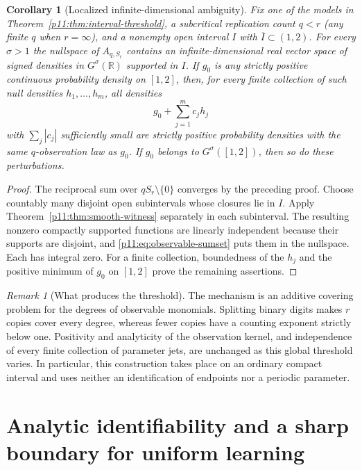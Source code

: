 \documentclass[11pt,letterpaper]{article}
\newtheorem{corollary}[theorem]{Corollary}
\theoremstyle{definition}
\theoremstyle{remark}
\newtheorem{remark}[theorem]{Remark}
\newcommand{\1}{\mathbf 1}
\begin{document}
\begin{corollary}[Localized infinite-dimensional ambiguity]
\label{p11:cor:interval-local-ambiguity}
Fix one of the models in Theorem~\ref{p11:thm:interval-threshold}, a
subcritical replication count $q<r$ (any finite $q$ when $r=\infty$),
and a nonempty open interval $I$ with $\overline I\subset(1,2)$.
For every $\sigma>1$ the nullspace of $A_{q,S_r}$ contains an
infinite-dimensional real vector space of signed densities in
$G^\sigma(\mathbb R)$ supported in $I$.
If $g_0$ is any strictly positive continuous probability density on
$[1,2]$, then, for every finite collection of such null densities
$h_1,\ldots,h_m$, all densities
\[
 g_0+\sum_{j=1}^m c_jh_j
\]
with $\sum_j|c_j|$ sufficiently small are strictly positive probability
densities with the same $q$-observation law as $g_0$.  If $g_0$ belongs
to $G^\sigma([1,2])$, then so do these perturbations.
\end{corollary}
\begin{proof}
The reciprocal sum over $qS_r\setminus\{0\}$ converges by the preceding
proof.  Choose countably many disjoint open subintervals whose closures
lie in $I$.  Apply Theorem~\ref{p11:thm:smooth-witness} separately in each
subinterval.  The resulting nonzero compactly supported functions are
linearly independent because their supports are disjoint, and
\eqref{p11:eq:observable-sumset} puts them in the nullspace.  Each has
integral zero.  For a finite collection, boundedness of the $h_j$ and
the positive minimum of $g_0$ on $[1,2]$ prove the remaining assertions.
\end{proof}

\begin{remark}[What produces the threshold]
The mechanism is an additive covering problem for the degrees of
observable monomials.  Splitting binary digits makes $r$ copies cover
every degree, whereas fewer copies have a counting exponent strictly
below one.  Positivity and analyticity of the observation kernel,
and independence of every finite collection of parameter jets, are
unchanged as this global threshold varies.  In particular, this
construction takes place on an ordinary compact interval and uses
neither an identification of endpoints nor a periodic parameter.
\end{remark}




\section{Analytic identifiability and a sharp boundary for uniform learning}
\label{p11:sec:analytic-minimax}
\end{document}
